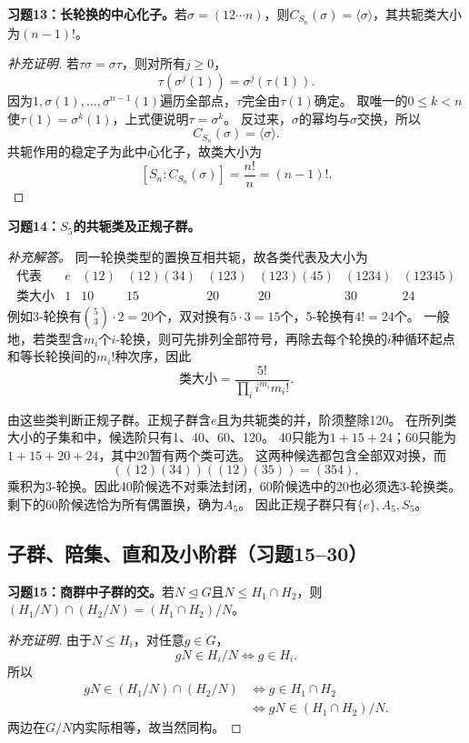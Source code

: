 \begin{problem}
\textbf{习题13：长轮换的中心化子。}若$\sigma=(12\cdots n)$，则$C_{S_n}(\sigma)=\langle\sigma\rangle$，其共轭类大小为$(n-1)!$。
\end{problem}
\begin{proof}[补充证明]
若$\tau\sigma=\sigma\tau$，则对所有$j\geq0$，
\[
\tau(\sigma^j(1))=\sigma^j(\tau(1)).
\]
因为$1,\sigma(1),\ldots,\sigma^{n-1}(1)$遍历全部点，$\tau$完全由$\tau(1)$确定。
取唯一的$0\leq k<n$使$\tau(1)=\sigma^k(1)$，上式便说明$\tau=\sigma^k$。
反过来，$\sigma$的幂均与$\sigma$交换，所以
\[
C_{S_n}(\sigma)=\langle\sigma\rangle.
\]
共轭作用的稳定子为此中心化子，故类大小为
\[
[S_n:C_{S_n}(\sigma)]=\frac{n!}{n}=(n-1)!.
\]
\end{proof}

\begin{problem}
\textbf{习题14：$S_5$的共轭类及正规子群。}
\end{problem}
\begin{solution}
\textit{补充解答。}
同一轮换类型的置换互相共轭，故各类代表及大小为
\[
\begin{array}{c|rrrrrrr}
\text{代表}&e&(12)&(12)(34)&(123)&(123)(45)&(1234)&(12345)\\\hline
\text{类大小}&1&10&15&20&20&30&24
\end{array}
\]
例如3-轮换有$\binom53\cdot2=20$个，双对换有$5\cdot3=15$个，5-轮换有$4!=24$个。
一般地，若类型含$m_i$个$i$-轮换，则可先排列全部符号，再除去每个轮换的$i$种循环起点和等长轮换间的$m_i!$种次序，因此
\[
\text{类大小}=\frac{5!}{\prod_i i^{m_i}m_i!}.
\]

由这些类判断正规子群。正规子群含$e$且为共轭类的并，阶须整除120。
在所列类大小的子集和中，候选阶只有1、40、60、120。
40只能为$1+15+24$；60只能为$1+15+20+24$，其中20暂有两个类可选。
这两种候选都包含全部双对换，而
\[
((12)(34))((12)(35))=(354),
\]
乘积为3-轮换。因此40阶候选不对乘法封闭，60阶候选中的20也必须选3-轮换类。
剩下的60阶候选恰为所有偶置换，确为$A_5$。
因此正规子群只有$\{e\},A_5,S_5$。
\end{solution}

\subsection*{子群、陪集、直和及小阶群（习题15--30）}

\begin{problem}
\textbf{习题15：商群中子群的交。}若$N\trianglelefteq G$且$N\leq H_1\cap H_2$，则
$(H_1/N)\cap(H_2/N)=(H_1\cap H_2)/N$。
\end{problem}
\begin{proof}[补充证明]
由于$N\leq H_i$，对任意$g\in G$，
\[
gN\in H_i/N\iff g\in H_i.
\]
所以
\begin{align*}
gN\in(H_1/N)\cap(H_2/N)
&\iff g\in H_1\cap H_2\\
&\iff gN\in(H_1\cap H_2)/N.
\end{align*}
两边在$G/N$内实际相等，故当然同构。
\end{proof}

